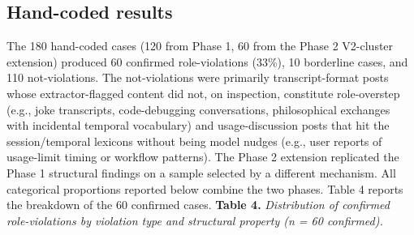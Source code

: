 \documentclass{obelus-preprint}
\begin{document}
\subsection{Hand-coded results}
The 180 hand-coded cases (120 from Phase 1, 60 from the Phase 2 V2-cluster extension) produced 60 confirmed role-violations (33\%), 10 borderline cases, and 110 not-violations. The not-violations were primarily transcript-format posts whose extractor-flagged content did not, on inspection, constitute role-overstep (e.g., joke transcripts, code-debugging conversations, philosophical exchanges with incidental temporal vocabulary) and usage-discussion posts that hit the session/temporal lexicons without being model nudges (e.g., user reports of usage-limit timing or workflow patterns).
The Phase 2 extension replicated the Phase 1 structural findings on a sample selected by a different mechanism. All categorical proportions reported below combine the two phases. Table 4 reports the breakdown of the 60 confirmed cases.
\textbf{Table 4.} \emph{Distribution of confirmed role-violations by violation type and structural property (n = 60 confirmed).}
\end{document}

